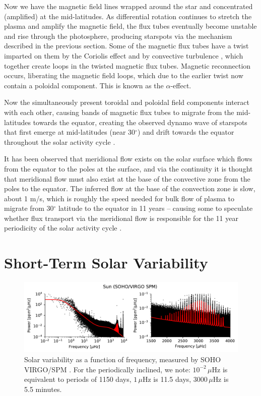 Now we have the magnetic field lines wrapped around the star and concentrated (amplified) at the mid-latitudes. As differential rotation continues to stretch the plasma and amplify the magnetic field, the flux tubes eventually become unstable and rise through the photosphere, producing starspots via the mechanism described in the previous section. Some of the magnetic flux tubes have a twist imparted on them by the Coriolis effect and by convective turbulence \citep{Parker1955a, Parker1955b}, which together create loops in the twisted magnetic flux tubes. Magnetic reconnection occurs, liberating the magnetic field loops, which due to the earlier twist now contain a poloidal component. This is known as the $\alpha$-effect. 

Now the simultaneously present toroidal and poloidal field components interact with each other, causing bands of magnetic flux tubes to migrate from the mid-latitudes towards the equator, creating the observed dynamo wave of starspots that first emerge at mid-latitudes (near 30$^\circ$) and drift towards the equator throughout the solar activity cycle \citep{Parker1955a, Parker1955b, Babcock1961}. 

It has been observed that meridional flow exists on the solar surface which flows from the equator to the poles at the surface, and via the continuity it is thought that meridional flow must also exist at the base of the convective zone from the poles to the equator. The inferred flow at the base of the convection zone is slow, about 1 m/s, which is roughly the speed needed for bulk flow of plasma to migrate from 30$^\circ$ latitude to the equator in 11 years -- causing some to speculate whether flux transport via the meridional flow is responsible for the 11 year periodicity of the solar activity cycle \citep{Dikpati2006,Hathaway2010}. 

\section{Short-Term Solar Variability} \label{sec:shorttermvar}

\begin{figure}
\centering
\includegraphics[scale=0.8]{intro/sun.pdf}
\caption{Solar variability as a function of frequency, measured by SOHO VIRGO/SPM \citep{Frohlich1997}. For the periodically inclined, we note: $10^{-2} \,\mu$Hz is equivalent to periods of 1150 days,  $1\,\mu$Hz is 11.5 days, $3000\,\mu$Hz is 5.5 minutes.} \label{fig:virgospm}
\end{figure}

